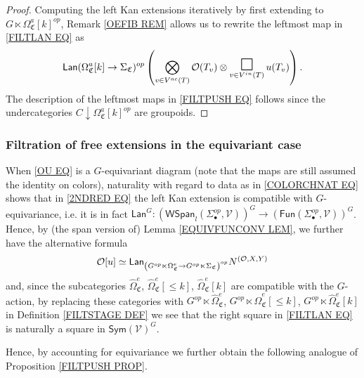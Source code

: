 \documentclass[a4paper,10pt
,draft
]{article}%
\renewcommand{\1}{\eta}%
\newcommand{\SC}{\Sigma_{\mathfrak C}}
\newcommand{\OC}{\Omega_{\mathfrak C}}
\begin{document}
\begin{proof}
Computing the left Kan extensions iteratively by first extending to
$G \ltimes \OC^a[k]^{op}$, 
Remark \ref{OEFIB REM} allows us to rewrite 
the leftmost map in \eqref{FILTLAN EQ} as
\begin{equation}\label{FILTLANFIN EQ}
	\mathsf{Lan}{(\OC^a[k] \to \SC)^{op}}\left(
		\bigotimes_{v \in V^{ac}(T)}\O(T_v) \otimes
		\mathop{\mathlarger{\mathlarger{\mathlarger{\square}}}}\limits_{v \in V^{in}(T)} u(T_v)
		\right).
\end{equation}
	The description of the leftmost maps in \eqref{FILTPUSH EQ} follows since the undercategories
	$C \downarrow \OC^a[k]^{op}$ are groupoids.
\end{proof}



\subsubsection{Filtration of free extensions in the equivariant case}


When \eqref{OU EQ} is a $G$-equivariant diagram (note that the maps are still assumed the identity on colors),
naturality with regard to data as in \eqref{COLORCHNAT EQ}
shows that in 
\eqref{2NDRED EQ} the left Kan extension 
is compatible with $G$-equivariance, i.e. it is in fact 
$
\mathsf{Lan}^G \colon 
\left(
\mathsf{WSpan}_l
(\Sigma^{op}_{\bullet},\mathcal{V})
\right)^G
\to
\left(
\mathsf{Fun}
(\Sigma^{op}_{\bullet},\mathcal{V})
\right)^G
$.
Hence, by (the span version of) Lemma \ref{EQUIVFUNCONV LEM},
we further have the alternative formula
\begin{equation}\label{3RDRED EQ}
\mathcal{O}[u] \simeq
	\mathsf{Lan}_{\left(G^{op} \ltimes \Omega_{\mathfrak C}^{e} \to
	G^{op} \ltimes \Sigma_{\mathfrak C}\right)^{op}} N^{(\mathcal{O},X,Y)}
\end{equation}
and, since the subcategories 
$\widehat{\Omega}_{\mathfrak{C}}^e$,
$\widehat{\Omega}_{\mathfrak{C}}^e[\leq k]$,
$\widehat{\Omega}_{\mathfrak{C}}^e[k]$
are compatible with the $G$-action, by replacing these categories with 
$G^{op} \ltimes \widehat{\Omega}_{\mathfrak{C}}^e$,
$G^{op} \ltimes \widehat{\Omega}_{\mathfrak{C}}^e[\leq k]$,
$G^{op} \ltimes \widehat{\Omega}_{\mathfrak{C}}^e[k]$
in Definition \ref{FILTSTAGE DEF}
we see that the right square in \eqref{FILTLAN EQ}
is naturally a square in 
$\mathsf{Sym}(\mathcal{V})^G$.

Hence, by accounting for equivariance
we further obtain the following analogue of 
Proposition \ref{FILTPUSH PROP}.
\end{document}
